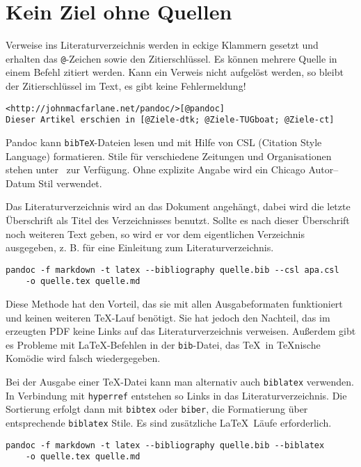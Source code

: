 \documentclass[11pt,ngerman,a4paper]{article}
\begin{document}
\section{Kein Ziel ohne Quellen}

Verweise ins Literaturverzeichnis werden in eckige Klammern gesetzt und
erhalten das \texttt{@}-Zeichen sowie den Zitierschlüssel. Es können
mehrere Quelle in einem Befehl zitiert werden. Kann ein Verweis nicht
aufgelöst werden, so bleibt der Zitierschlüssel im Text, es gibt keine
Fehlermeldung!

\begin{verbatim}
<http://johnmacfarlane.net/pandoc/>[@pandoc]
Dieser Artikel erschien in [@Ziele-dtk; @Ziele-TUGboat; @Ziele-ct]
\end{verbatim}

Pandoc kann \texttt{bibTeX}-Dateien lesen und mit Hilfe von CSL
(Citation Style Language) formatieren. Stile für verschiedene Zeitungen
und Organisationen stehen unter~\autocite{csl} zur Verfügung. Ohne
explizite Angabe wird ein Chicago Autor--Datum Stil verwendet.

Das Literaturverzeichnis wird an das Dokument angehängt, dabei wird die
letzte Überschrift als Titel des Verzeichnisses benutzt. Sollte es nach
dieser Überschrift noch weiteren Text geben, so wird er vor dem
eigentlichen Verzeichnis ausgegeben, z. B. für eine Einleitung zum
Literaturverzeichnis.

\begin{verbatim}
pandoc -f markdown -t latex --bibliography quelle.bib --csl apa.csl 
    -o quelle.tex quelle.md
\end{verbatim}

Diese Methode hat den Vorteil, das sie mit allen Ausgabeformaten
funktioniert und keinen weiteren TeX-Lauf benötigt. Sie hat jedoch den
Nachteil, das im erzeugten PDF keine Links auf das Literaturverzeichnis
verweisen. Außerdem gibt es Probleme mit LaTeX-Befehlen in der
\texttt{bib}-Datei, das TeX~in TeXnische Komödie wird falsch
wiedergegeben.

Bei der Ausgabe einer TeX-Datei kann man alternativ auch
\texttt{biblatex} verwenden. In Verbindung mit \texttt{hyperref}
entstehen so Links in das Literaturverzeichnis. Die Sortierung erfolgt
dann mit \texttt{bibtex} oder \texttt{biber}, die Formatierung über
entsprechende \texttt{biblatex} Stile. Es sind zusätzliche LaTeX~Läufe
erforderlich.

\begin{verbatim}
pandoc -f markdown -t latex --bibliography quelle.bib --biblatex 
    -o quelle.tex quelle.md
\end{verbatim}
\end{document}
